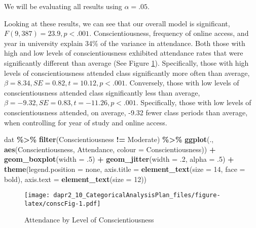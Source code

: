 \documentclass[
]{article}
\newenvironment{Shaded}{\begin{snugshade}}{\end{snugshade}}
\newcommand{\AttributeTok}[1]{\textcolor[rgb]{0.13,0.29,0.53}{#1}}
\newcommand{\DecValTok}[1]{\textcolor[rgb]{0.00,0.00,0.81}{#1}}
\newcommand{\FunctionTok}[1]{\textcolor[rgb]{0.13,0.29,0.53}{\textbf{#1}}}
\newcommand{\NormalTok}[1]{#1}
\newcommand{\SpecialCharTok}[1]{\textcolor[rgb]{0.81,0.36,0.00}{\textbf{#1}}}
\newcommand{\StringTok}[1]{\textcolor[rgb]{0.31,0.60,0.02}{#1}}
\begin{document}
We will be evaluating all results using \(\alpha = .05\).

Looking at these results, we can see that our overall model is significant, \(F(9, 387) = 23.9, p < .001\). Conscientiousness, frequency of online access, and year in university explain 34\% of the variance in attendance. Both those with high and low levels of conscientiousness exhibited attendance rates that were significantly different than average (See Figure \ref{fig:conscFig}). Specifically, those with high levels of conscientiousness attended class significantly more often than average, \(\beta = 8.34, SE = 0.82, t = 10.12, p < .001\). Conversely, those with low levels of conscientiousness attended class significantly less than average, \(\beta = -9.32, SE = 0.83, t = -11.26, p < .001\). Specifically, those with low levels of conscientiousness attended, on average, -9.32 fewer class periods than average, when controlling for year of study and online access.

\begin{Shaded}
\begin{Highlighting}[]
\NormalTok{dat }\SpecialCharTok{\%\textgreater{}\%}
  \FunctionTok{filter}\NormalTok{(Conscientiousness }\SpecialCharTok{!=} \StringTok{\textquotesingle{}Moderate\textquotesingle{}}\NormalTok{) }\SpecialCharTok{\%\textgreater{}\%}
  \FunctionTok{ggplot}\NormalTok{(., }\FunctionTok{aes}\NormalTok{(Conscientiousness, Attendance, }\AttributeTok{colour =}\NormalTok{ Conscientiousness)) }\SpecialCharTok{+} 
  \FunctionTok{geom\_boxplot}\NormalTok{(}\AttributeTok{width =}\NormalTok{ .}\DecValTok{5}\NormalTok{) }\SpecialCharTok{+} 
  \FunctionTok{geom\_jitter}\NormalTok{(}\AttributeTok{width =}\NormalTok{ .}\DecValTok{2}\NormalTok{, }\AttributeTok{alpha =}\NormalTok{ .}\DecValTok{5}\NormalTok{) }\SpecialCharTok{+} 
  \FunctionTok{theme}\NormalTok{(}\AttributeTok{legend.position =} \StringTok{\textquotesingle{}none\textquotesingle{}}\NormalTok{,}
        \AttributeTok{axis.title =} \FunctionTok{element\_text}\NormalTok{(}\AttributeTok{size =} \DecValTok{14}\NormalTok{, }\AttributeTok{face =} \StringTok{\textquotesingle{}bold\textquotesingle{}}\NormalTok{),}
        \AttributeTok{axis.text =} \FunctionTok{element\_text}\NormalTok{(}\AttributeTok{size =} \DecValTok{12}\NormalTok{))}
\end{Highlighting}
\end{Shaded}

\begin{figure}
\centering
\texttt{[image: dapr2\_10\_CategoricalAnalysisPlan\_files/figure-latex/conscFig-1.pdf]}
\caption{\label{fig:conscFig}Attendance by Level of Conscientiousness}
\end{figure}
\end{document}
